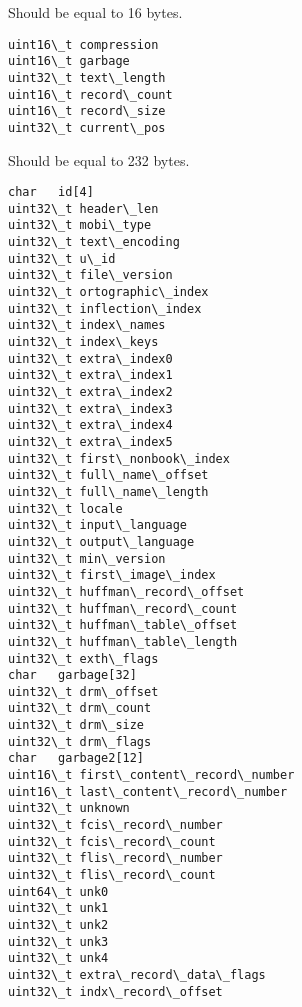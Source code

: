\documentclass[letterpaper,10pt,english]{sphinxmanual}
\begin{document}

\begin{fulllineitems}
\label{functions:st_palmdoc}
Should be equal to 16 bytes.

\begin{Verbatim}[commandchars=\\\{\}]
uint16\_t compression
uint16\_t garbage
uint32\_t text\_length
uint16\_t record\_count
uint16\_t record\_size
uint32\_t current\_pos
\end{Verbatim}

\end{fulllineitems}


\begin{fulllineitems}
\label{functions:st_mobi}
Should be equal to 232 bytes.

\begin{Verbatim}[commandchars=\\\{\}]
char   id[4]
uint32\_t header\_len
uint32\_t mobi\_type
uint32\_t text\_encoding
uint32\_t u\_id
uint32\_t file\_version
uint32\_t ortographic\_index
uint32\_t inflection\_index
uint32\_t index\_names
uint32\_t index\_keys
uint32\_t extra\_index0
uint32\_t extra\_index1
uint32\_t extra\_index2
uint32\_t extra\_index3
uint32\_t extra\_index4
uint32\_t extra\_index5
uint32\_t first\_nonbook\_index
uint32\_t full\_name\_offset
uint32\_t full\_name\_length
uint32\_t locale
uint32\_t input\_language
uint32\_t output\_language
uint32\_t min\_version
uint32\_t first\_image\_index
uint32\_t huffman\_record\_offset
uint32\_t huffman\_record\_count
uint32\_t huffman\_table\_offset
uint32\_t huffman\_table\_length
uint32\_t exth\_flags
char   garbage[32]
uint32\_t drm\_offset
uint32\_t drm\_count
uint32\_t drm\_size
uint32\_t drm\_flags
char   garbage2[12]
uint16\_t first\_content\_record\_number
uint16\_t last\_content\_record\_number
uint32\_t unknown
uint32\_t fcis\_record\_number
uint32\_t fcis\_record\_count
uint32\_t flis\_record\_number
uint32\_t flis\_record\_count
uint64\_t unk0
uint32\_t unk1
uint32\_t unk2
uint32\_t unk3
uint32\_t unk4
uint32\_t extra\_record\_data\_flags
uint32\_t indx\_record\_offset
\end{Verbatim}

\end{fulllineitems}
\end{document}
